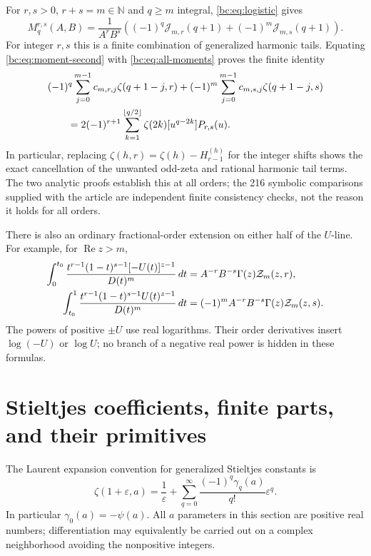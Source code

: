 \documentclass[11pt,letterpaper]{article}
\numberwithin{equation}{section}
\theoremstyle{definition}
\theoremstyle{remark}
\newcommand{\bcRe}{\operatorname{Re}}
\newcommand{\bcZ}{\mathcal Z}
\newcommand{\bcJ}{\mathcal J}
\newcommand{\bcN}{\mathbb N}
\begin{document}
For $r,s>0$, $r+s=m\in\bcN$ and $q\ge m$ integral,
\eqref{bc:eq:logistic} gives
\begin{equation}\label{bc:eq:moment-second}
 M_q^{r,s}(A,B)=\frac1{A^rB^s}
    \left((-1)^q\bcJ_{m,r}(q+1)+(-1)^m\bcJ_{m,s}(q+1)\right).
\end{equation}
For integer $r,s$ this is a finite combination of generalized harmonic
tails. Equating \eqref{bc:eq:moment-second} with
\eqref{bc:eq:all-moments} proves the finite identity
\begin{align}
 &(-1)^q\sum_{j=0}^{m-1}c_{m,r,j}\zeta(q+1-j,r)
  +(-1)^m\sum_{j=0}^{m-1}c_{m,s,j}\zeta(q+1-j,s)\notag\\
 &\qquad=2(-1)^{r+1}
     \sum_{k=1}^{\lfloor q/2\rfloor}
                   \zeta(2k)[u^{q-2k}]P_{r,s}(u).
 \label{bc:eq:hurwitz-cancellation}
\end{align}
In particular, replacing
$\zeta(h,r)=\zeta(h)-H_{r-1}^{(h)}$ for the integer shifts shows the
exact cancellation of the unwanted odd-zeta and rational harmonic
tail terms. The two analytic proofs establish this at all orders; the
216 symbolic comparisons supplied with the article are independent
finite consistency checks, not the reason it holds for all orders.

There is also an ordinary fractional-order extension on either half
of the $U$-line. For example, for $\bcRe z>m$,
\begin{align}
 \int_0^{t_0}\frac{t^{r-1}(1-t)^{s-1}[-U(t)]^{z-1}}
                        {D(t)^m}\,dt
       &=A^{-r}B^{-s}\Gamma(z)\bcZ_m(z,r),\notag\\
 \int_{t_0}^{1}\frac{t^{r-1}(1-t)^{s-1}U(t)^{z-1}}
                        {D(t)^m}\,dt
       &=(-1)^mA^{-r}B^{-s}\Gamma(z)\bcZ_m(z,s).
 \label{bc:eq:half-Mellin}
\end{align}
The powers of positive $\pm U$ use real logarithms. Their order
derivatives insert $\log(-U)$ or $\log U$; no branch of a negative
real power is hidden in these formulas.

\section{Stieltjes coefficients, finite parts, and their primitives}
\label{bc:sec:stieltjes}

The Laurent expansion convention for generalized Stieltjes constants is
\begin{equation}\label{bc:eq:stieltjes-convention}
 \zeta(1+\varepsilon,a)=\frac1\varepsilon+
     \sum_{q=0}^\infty\frac{(-1)^q\gamma_q(a)}{q!}\varepsilon^q.
\end{equation}
In particular $\gamma_0(a)=-\psi(a)$. All $a$ parameters in this section
are positive real numbers; differentiation may equivalently be carried
out on a complex neighborhood avoiding the nonpositive integers.
\end{document}
